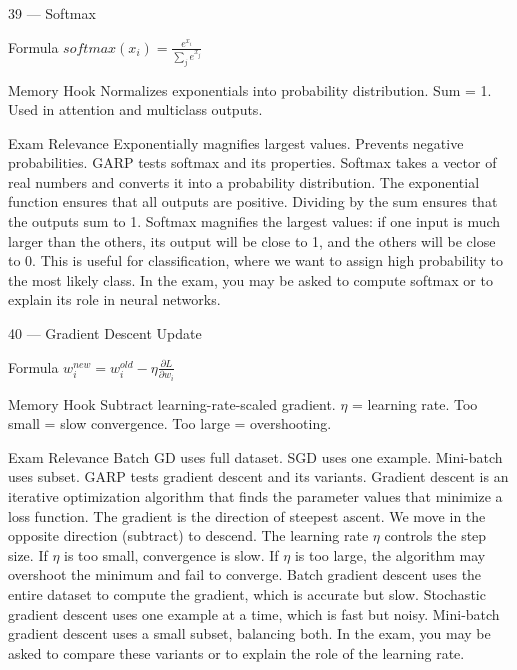 \documentclass[aspectratio=169,8pt]{beamer}
\begin{document}
	\begin{frame}{39 --- Softmax}
		\begin{block}{Formula}
			$softmax(x_i) = \frac{e^{x_i}}{\sum_j e^{x_j}}$
		\end{block}
		\begin{block}{Memory Hook}
			Normalizes exponentials into probability distribution. Sum = 1. Used in attention and multiclass outputs.
		\end{block}
		\begin{block}{Exam Relevance}
			Exponentially magnifies largest values. Prevents negative probabilities. GARP tests softmax and its properties. Softmax takes a vector of real numbers and converts it into a probability distribution. The exponential function ensures that all outputs are positive. Dividing by the sum ensures that the outputs sum to 1. Softmax magnifies the largest values: if one input is much larger than the others, its output will be close to 1, and the others will be close to 0. This is useful for classification, where we want to assign high probability to the most likely class. In the exam, you may be asked to compute softmax or to explain its role in neural networks.
		\end{block}
	\end{frame}
	
	\begin{frame}{40 --- Gradient Descent Update}
		\begin{block}{Formula}
			$w_i^{new} = w_i^{old} - \eta\frac{\partial L}{\partial w_i}$
		\end{block}
		\begin{block}{Memory Hook}
			Subtract learning-rate-scaled gradient. $\eta$ = learning rate. Too small = slow convergence. Too large = overshooting.
		\end{block}
		\begin{block}{Exam Relevance}
			Batch GD uses full dataset. SGD uses one example. Mini-batch uses subset. GARP tests gradient descent and its variants. Gradient descent is an iterative optimization algorithm that finds the parameter values that minimize a loss function. The gradient is the direction of steepest ascent. We move in the opposite direction (subtract) to descend. The learning rate $\eta$ controls the step size. If $\eta$ is too small, convergence is slow. If $\eta$ is too large, the algorithm may overshoot the minimum and fail to converge. Batch gradient descent uses the entire dataset to compute the gradient, which is accurate but slow. Stochastic gradient descent uses one example at a time, which is fast but noisy. Mini-batch gradient descent uses a small subset, balancing both. In the exam, you may be asked to compare these variants or to explain the role of the learning rate.
		\end{block}
	\end{frame}
	
\end{document}
